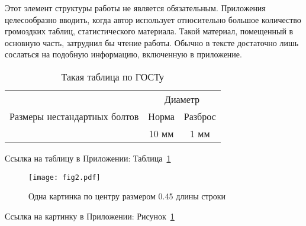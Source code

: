 \Appendix


Этот элемент структуры работы не является обязательным. Приложения целесообразно вводить, когда автор использует относительно большое количество громоздких таблиц, статистического материала. Такой материал, помещенный в основную часть, затруднил бы чтение работы. Обычно в тексте достаточно лишь сослаться на подобную информацию, включенную в приложение.



\begin{table}[H]
	\caption{Такая таблица по ГОСТу}
	\label{tab:GOST3}
	\begin{center}
		\begin{tabular}{|c|c|c|}
			\hline
			\multirow{3}{*}{Размеры нестандартных болтов} & \multicolumn{2}{c|}{Диаметр} \\
			\cline{2-3}
			& Норма & Разброс \\
			\cline{2-3}
			& 10 мм & 1 мм \\
			\hline
		\end{tabular}
	\end{center}
\end{table}
Ссылка на таблицу в Приложении: Таблица~\ref{tab:GOST3}

\begin{figure}[h]
	\centering
	\texttt{[image: fig2.pdf]}
	\caption{Одна картинка по центру размером 0.45 длины строки}
	\label{fig:App1}%
\end{figure}

Ссылка на картинку в Приложении: Рисунок~\ref{fig:App1}